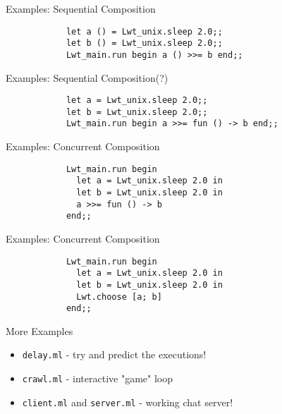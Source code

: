 \documentclass{beamer}
\newcommand{\code}[1]{\texttt{#1}}
\begin{document}
    \begin{frame}[fragile=singleslide]{Examples: Sequential Composition}
        \begin{verbatim}
            let a () = Lwt_unix.sleep 2.0;;
            let b () = Lwt_unix.sleep 2.0;;
            Lwt_main.run begin a () >>= b end;;
        \end{verbatim}
    \end{frame}

    \begin{frame}[fragile=singleslide]{Examples: Sequential Composition(?)}
        \begin{verbatim}
            let a = Lwt_unix.sleep 2.0;;
            let b = Lwt_unix.sleep 2.0;;
            Lwt_main.run begin a >>= fun () -> b end;;
        \end{verbatim}
    \end{frame}

    \begin{frame}[fragile=singleslide]{Examples: Concurrent Composition}
        \begin{verbatim}  
            Lwt_main.run begin
              let a = Lwt_unix.sleep 2.0 in
              let b = Lwt_unix.sleep 2.0 in
              a >>= fun () -> b
            end;;
        \end{verbatim}
    \end{frame}

    \begin{frame}[fragile=singleslide]{Examples: Concurrent Composition}
        \begin{verbatim}  
            Lwt_main.run begin
              let a = Lwt_unix.sleep 2.0 in
              let b = Lwt_unix.sleep 2.0 in
              Lwt.choose [a; b]
            end;;
        \end{verbatim}
    \end{frame}

    \begin{frame}{More Examples}
        \begin{itemize}
            \item<1-> \code{delay.ml} - try and predict the executions!
            \item<2-> \code{crawl.ml} - interactive "game" loop
            \item<3-> \code{client.ml} and \code{server.ml} - working chat server!
        \end{itemize}
    \end{frame}
\end{document}
